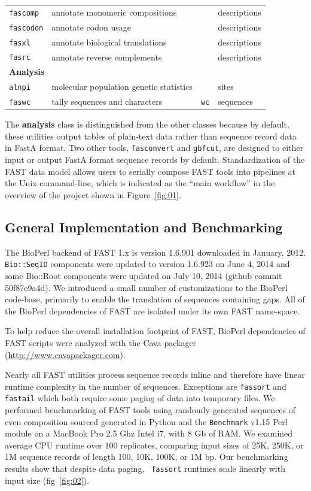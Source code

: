 \documentclass{frontiersSCNS} %
\begin{document}
\begin{table}[!t]
{\begin{tabular}{llll}
    {\tt fascomp} & annotate monomeric compositions &  & descriptions \\
    {\tt fascodon} & annotate codon usage &  & descriptions \\
    {\tt fasxl} & annotate biological translations &  & descriptions \\
    {\tt fasrc} & annotate reverse complements &  & descriptions \\
\hline
  \multicolumn{4}{l}{{\bf Analysis}} \\
  \hline   
    {\tt alnpi} & molecular population genetic statistics &  &  sites \\
    {\tt faswc} & tally sequences and characters & {\tt wc} &   sequences \\
  \hline   
\end{tabular}}{}
\end{table}

The {\bf analysis} class is distinguished from the other classes
because by default, these utilities output tables of plain-text data
rather than sequence record data in FastA format. Two other tools,
{\tt fasconvert} and {\tt gbfcut}, are designed to either input or
output FastA format sequence records by default. Standardization of
the FAST data model allows users to serially compose FAST tools into
pipelines at the Unix command-line, which is indicated as the ``main
workflow'' in the overview of the project shown in
Figure~\ref{fig:01}.

\subsection{General Implementation and Benchmarking}

The BioPerl backend of FAST 1.x is version 1.6.901 downloaded in
January, 2012. {\tt Bio::SeqIO} components were updated to version 1.6.923
on June 4, 2014 and some Bio::Root components were updated on July 10,
2014 (github commit 50f87e9a4d).  We introduced a small number of
customizations to the BioPerl code-base, primarily to
enable the translation of sequences containing gaps. All of the
BioPerl dependencies of FAST are isolated under its own FAST
name-space.

To help reduce the overall installation footprint of FAST, BioPerl
dependencies of FAST scripts were analyzed with the Cava packager
(\url{http://www.cavapackager.com}).

Nearly all FAST utilities process sequence records inline and
therefore have linear runtime complexity in the number of
sequences. Exceptions are {\tt fassort} and {\tt fastail} which both
require some paging of data into temporary files. We performed
benchmarking of FAST tools using randomly generated sequences of even
composition sourced generated in Python and the {\tt Benchmark} v1.15
Perl module on a MacBook Pro 2.5 Ghz Intel i7, with 8 Gb of RAM. We
examined average CPU runtime over 100 replicates, comparing input
sizes of 25K, 250K, or 1M sequence records of length 100, 10K, 100K,
or 1M bp. Our benchmarking results show that despite data paging, {\tt
  fassort} runtimes scale linearly with input size (fig~\ref{fig:02}).
\end{document}
